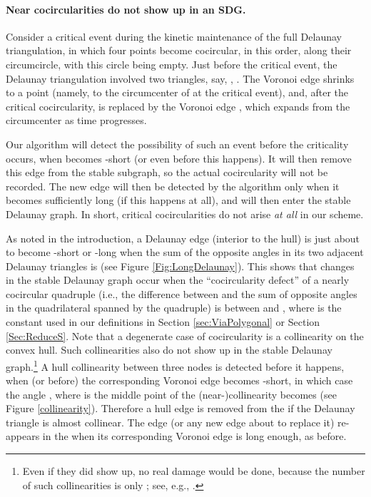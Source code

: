 \documentclass[letter,11pt]{article}
\begin{document}
\paragraph{Near cocircularities do not show up in an SDG.}
Consider a critical event during the kinetic maintenance of the full
Delaunay triangulation, in which four points  become cocircular,
in this order, along their circumcircle, with this circle being empty.
Just before the critical event, the Delaunay triangulation involved
two triangles, say, , . The Voronoi edge  shrinks
to a point (namely, to the circumcenter of  at the critical event),
and, after the critical cocircularity, is replaced by the Voronoi edge
, which expands from the circumcenter as time progresses.

Our algorithm will detect the possibility of such an event before the criticality occurs,
when  becomes -short (or even before this happens). It will then remove this edge from the stable subgraph,
so the actual cocircularity will not be recorded. The new edge 
will then be detected by the algorithm only when it becomes sufficiently long
(if this happens at all), and will then enter the stable Delaunay graph. In short,
critical cocircularities do not arise {\em at all} in our scheme.

As noted in the introduction, a Delaunay edge  (interior to the hull) is just about to become -short or -long when the sum of the opposite angles in its two adjacent Delaunay triangles is  (see Figure \ref{Fig:LongDelaunay}). This shows that changes in the stable Delaunay graph occur when the
``cocircularity defect'' of a nearly cocircular quadruple (i.e., the difference between  and the sum of opposite angles in the quadrilateral spanned by the quadruple) is between
 and , where  is the constant used in our definitions in Section \ref{sec:ViaPolygonal} or Section \ref{Sec:ReduceS}.
Note that a degenerate case of cocircularity is a collinearity on the convex
hull.
Such collinearities also do not show up in the stable
Delaunay graph.\footnote{Even if they did show up, no real damage would be done, because the number of such collinearities is only ; see, e.g., \cite{SA95}.} A hull collinearity between three nodes  is
detected before it happens, when (or before) the corresponding Voronoi edge
becomes -short, in which case the angle , where  is the middle point of the (near-)collinearity becomes  (see Figure \ref{collinearity}). 
Therefore a hull edge is removed from the  if the Delaunay triangle is
almost collinear. The edge (or any new edge about to replace it) re-appears in the  when its corresponding
Voronoi edge is long enough, as before. 
\end{document}
